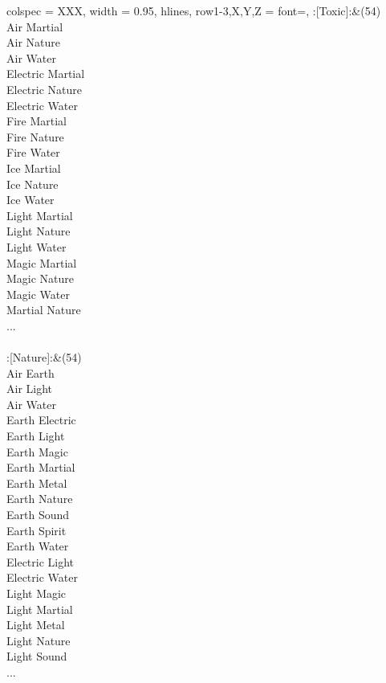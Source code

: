 \begin{longtblr}[
	caption = {1v2 Attacking Effective},
	label = {1v2-Attacking-Effective},
]{
	colspec = {XXX}, width = 0.95\linewidth,
	hlines,
	row{1-3,X,Y,Z} = {font=\bfseries},
}
	:[Toxic]:&{(54)\\
	Air Martial \\
	Air Nature \\
	Air Water \\
	Electric Martial \\
	Electric Nature \\
	Electric Water \\
	Fire Martial \\
	Fire Nature \\
	Fire Water \\
	Ice Martial \\
	Ice Nature \\
	Ice Water \\
	Light Martial \\
	Light Nature \\
	Light Water \\
	Magic Martial \\
	Magic Nature \\
	Magic Water \\
	Martial Nature \\
	...\\
	}\\

	:[Nature]:&{(54)\\
	Air Earth \\
	Air Light \\
	Air Water \\
	Earth Electric \\
	Earth Light \\
	Earth Magic \\
	Earth Martial \\
	Earth Metal \\
	Earth Nature \\
	Earth Sound \\
	Earth Spirit \\
	Earth Water \\
	Electric Light \\
	Electric Water \\
	Light Magic \\
	Light Martial \\
	Light Metal \\
	Light Nature \\
	Light Sound \\
	...\\
	}\\


\end{longtblr}
